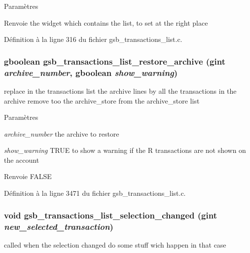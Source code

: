 \begin{DoxyParams}{Paramètres}
\item[{\em }]\end{DoxyParams}
\begin{DoxyReturn}{Renvoie}
the widget which contains the list, to set at the right place 
\end{DoxyReturn}


Définition à la ligne 316 du fichier gsb\_\-transactions\_\-list.c.

\subsubsection[{gsb\_\-transactions\_\-list\_\-restore\_\-archive}]{\setlength{\rightskip}{0pt plus 5cm}gboolean gsb\_\-transactions\_\-list\_\-restore\_\-archive (gint {\em archive\_\-number}, \/  gboolean {\em show\_\-warning})}\label{gsb__transactions__list_8h_afb50643bfc50dcd627a5f720c30c8765}
replace in the transactions list the archive lines by all the transactions in the archive remove too the archive\_\-store from the archive\_\-store list


\begin{DoxyParams}{Paramètres}
\item[{\em archive\_\-number}]the archive to restore \item[{\em show\_\-warning}]TRUE to show a warning if the R transactions are not shown on the account\end{DoxyParams}
\begin{DoxyReturn}{Renvoie}
FALSE 
\end{DoxyReturn}


Définition à la ligne 3471 du fichier gsb\_\-transactions\_\-list.c.

\subsubsection[{gsb\_\-transactions\_\-list\_\-selection\_\-changed}]{\setlength{\rightskip}{0pt plus 5cm}void gsb\_\-transactions\_\-list\_\-selection\_\-changed (gint {\em new\_\-selected\_\-transaction})}\label{gsb__transactions__list_8h_a2528e018beffeb0d2ce2f2386e690360}
called when the selection changed do some stuff wich happen in that case


